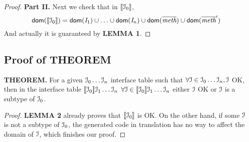 \begin{proof}
\noindent\textbf{Part II.} Next we check that in $[\![{\cal{I}}_0]\!]$, $$\textsf{dom}([\![{\cal{I}}_0]\!])=\textsf{dom}(\textit{I}_1)\cup\ldots\cup\textsf{dom}(\textit{I}_n)\cup\textsf{dom}(\overline{\textit{meth}})\cup\textsf{dom}(\overline{\textit{meth}}')$$
And actually it is guaranteed by \textbf{LEMMA 1}.

\end{proof}

\subsection{Proof of THEOREM}\label{subsec:proof3}
\textbf{THEOREM. }
For a given ${\cal{I}}_0\ldots{\cal{I}}_n$ interface table such that
$\forall{\cal{I}}\in{\cal{I}}_0\ldots{\cal{I}}_n, {\cal{I}}$ OK, then in the interface table
$[\![{\cal{I}}_0]\!]{\cal{I}}_1\ldots{\cal{I}}_n$
$\forall{\cal{I}}\in[\![{\cal{I}}_0]\!]{\cal{I}}_1\ldots{\cal{I}}_n$ either ${\cal{I}}$ OK or ${\cal{I}}$ is a subtype of ${\cal{I}}_0$.
\begin{proof}
\textbf{LEMMA 2} already proves that $[\![{\cal{I}}_0]\!]$ is OK. On the other hand, if some ${\cal{I}}$ is not a subtype of ${\cal{I}}_0$,
 the generated code in translation has no way to affect the domain of ${\cal{I}}$, which finishes our proof.
\end{proof}
